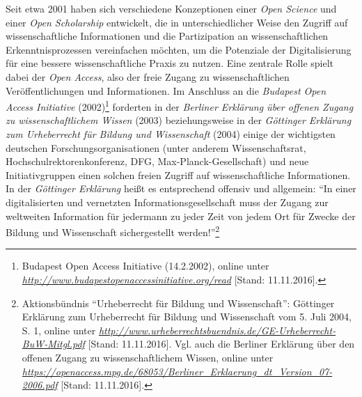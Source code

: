 \documentclass[a4paper,
fontsize=11pt,
oneside,
numbers=noperiodatend,
parskip=half-,
bibliography=totoc,
final
]{scrartcl}
\begin{document}
Seit etwa 2001 haben sich verschiedene Konzeptionen einer \emph{Open
Science} und einer \emph{Open Scholarship} entwickelt, die in
unterschiedlicher Weise den Zugriff auf wissenschaftliche Informationen
und die Partizipation an wissenschaftlichen Erkenntnisprozessen
vereinfachen möchten, um die Potenziale der Digitalisierung für eine
bessere wissenschaftliche Praxis zu nutzen. Eine zentrale Rolle spielt
dabei der \emph{Open Access}, also der freie Zugang zu
wissenschaftlichen Veröffentlichungen und Informationen. Im Anschluss an
die \emph{Budapest Open Access Initiative} (2002)\footnote{Budapest Open
  Access Initiative (14.2.2002), online unter
  \href{http://www.budapestopenaccessinitiative.org/read}{\emph{http://www.budapestopenaccessinitiative.org/read}}
  {[}Stand: 11.11.2016{]}.} forderten in der \emph{Berliner Erklärung
über offenen Zugang zu wissenschaftlichem Wissen} (2003) beziehungsweise
in der \emph{Göttinger Erklärung zum Urheberrecht für Bildung und
Wissenschaft} (2004) einige der wichtigsten deutschen
Forschungsorganisationen (unter anderem Wissenschaftsrat,
Hochschulrektorenkonferenz, DFG, Max-Planck-Gesellschaft) und neue
Initiativgruppen einen solchen freien Zugriff auf wissenschaftliche
Informationen. In der \emph{Göttinger Erklärung} heißt es entsprechend
offensiv und allgemein: \enquote{In einer digitalisierten und vernetzten
Informationsgesellschaft muss der Zugang zur weltweiten Information für
jedermann zu jeder Zeit von jedem Ort für Zwecke der Bildung und
Wissenschaft sichergestellt werden!}\footnote{Aktionsbündnis
  \enquote{Urheberrecht für Bildung und Wissenschaft}: Göttinger
  Erklärung zum Urheberrecht für Bildung und Wissenschaft vom 5. Juli
  2004, S. 1, online unter
  \href{http://www.urheberrechtsbuendnis.de/GE-Urheberrecht-BuW-Mitgl.pdf}{\emph{http://www.urheberrechtsbuendnis.de/GE-Urheberrecht-BuW-Mitgl.pdf}}
  {[}Stand: 11.11.2016{]}. Vgl. auch die Berliner Erklärung über den
  offenen Zugang zu wissenschaftlichem Wissen, online unter
  \href{https://openaccess.mpg.de/68053/Berliner_Erklaerung_dt_Version_07-2006.pdf}{\emph{https://openaccess.mpg.de/68053/Berliner\_Erklaerung\_dt\_Version\_07-2006.pdf}}
  {[}Stand: 11.11.2016{]}.}
\end{document}
